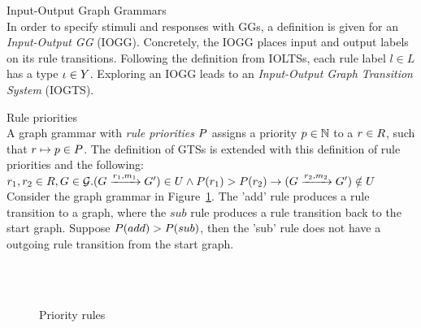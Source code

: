 \vspace{5px}
\begin{definition} Input-Output Graph Grammars \\
In order to specify stimuli and responses with GGs, a definition is given for an \textit{Input-Output GG} (IOGG). Concretely, the IOGG places input and output labels on its rule transitions. Following the definition from IOLTSs, each rule label $l \in L$ has a type $\iota \in Y$. Exploring an IOGG leads to an \textit{Input-Output Graph Transition System} (IOGTS).
\end{definition}
\vspace{5px}

\vspace{5px}\begin{definition} Rule priorities \\
A graph grammar with \textit{rule priorities} $P$ assigns a priority $p\in\mathbb{N}$ to a $r \in R$, such that ${r \mapsto p}\in P$. The definition of GTSs is extended with this definition of rule priorities and the following:\\
\vspace{2px}
$r_1, r_2\in R, G \in \mathcal{G} . (G \xrightarrow{r_1, m_1}G') \in U \land P(r_1) > P(r_2) \rightarrow (G \xrightarrow{r_2, m_2}G') \notin U$\\
\vspace{2px}
Consider the graph grammar in Figure~\ref{fig:priority_gg}. The 'add' rule produces a rule transition to a graph, where the $sub$ rule produces a rule transition back to the start graph. Suppose $P(add) > P(sub)$, then the 'sub' rule does not have a outgoing rule transition from the start graph.

\begin{figure}[ht]
  \begin{center}
    \\
    \hspace{20px}
    \\
    \hspace{20px}
  \end{center}
  \caption{Priority rules}
  \label{fig:priority_gg}
\end{figure} 
\end{definition}